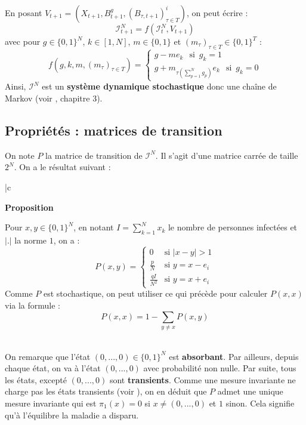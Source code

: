 \documentclass[a4paper,10.9pt]{article}
\begin{document}
En posant $V_{t+1}=(X_{t+1}, B^g_{t+1}, (B_{\tau, t+1})^i_{\tau \in T})$, on peut écrire :
$$\boxed{\mathcal{I}_{t+1}^N = f(\mathcal{I}_t^N, V_{t+1})}$$
avec pour $g \in \{0,1\}^N$, $k \in [1,N]$, $m \in \{0,1\}$ et $(m_{\tau})_{\tau \in T} \in \{0,1\}^T$ :
$$\boxed{ f(g,k,m,(m_{\tau})_{\tau \in T}) = \left\{
\begin{array}{ll}
        g-m e_k \ \ \operatorname{si} \ g_k=1  \\
        g + m_{\tau\left(\sum_{p=1}^N g_p\right)}e_k \ \ \operatorname{si} \ g_k=0
\end{array}
\right. }$$
Ainsi, $\mathcal{I}^N$ est un \textbf{système dynamique stochastique} donc une chaîne de Markov (voir \cite{DelmasCourse}, chapitre 3). \\

\subsection{Propriétés : matrices de transition}

On note $P$ la matrice de transition de $\mathcal{I}^N$. Il s'agit d'une matrice carrée de taille $2^N$. On a le résultat suivant : \\

\begin{tabular}{|c}
\begin{minipage}{\textwidth}
\textbf{Proposition}

Pour $x,y \in \{0,1\}^N$, en notant $I=\sum_{k=1}^N x_k$ le nombre de personnes infectées et $|.|$ la norme $1$, on a :
\[\boxed{
P(x,y) = \left\{
\begin{array}{ll}
0 & \text{si } |x-y| > 1 \\
\frac{p}{N} & \text{si } y=x-e_i \\
\frac{q I}{N^2} & \text{si } y=x+e_i
\end{array}
\right. }
\]
Comme $P$ est stochastique, on peut utiliser ce qui précède pour calculer $P(x,x)$ via la formule :
$$P(x,x)=1-\sum_{y \neq x} P(x,y)$$
\end{minipage}
\end{tabular} \\

On remarque que l'état $(0,...,0)\in \{0,1\}^N$ est \textbf{absorbant}. Par ailleurs, depuis chaque état, on va à l'état $(0,...,0)$ avec probabilité non nulle. Par suite, tous les états, excepté $(0,...,0)$ sont \textbf{transients}. Comme une mesure invariante ne charge pas les états transients (voir \cite{DelmasCourse}), on en déduit que $P$ admet une unique mesure invariante qui est $\pi_1(x)=0$ si $x \neq (0,...,0)$ et $1$ sinon. Cela signifie qu'à l'équilibre la maladie a disparu. \\
\end{document}
